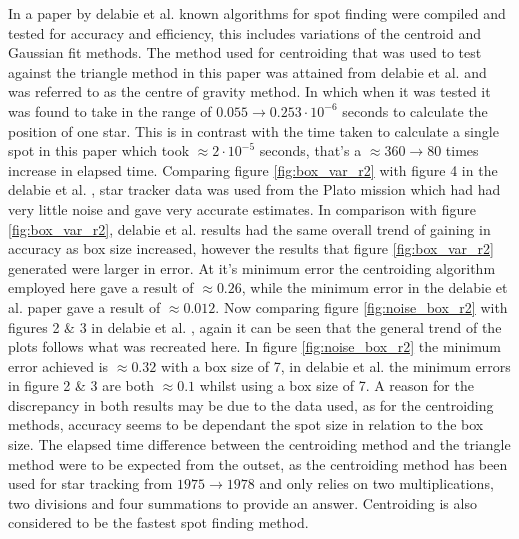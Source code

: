 \documentclass[aps,pra,a4paper,nofootinbib,onecolumn,tightenlines,longbibliography,12pt,amsfonts,amssymb,amsmath,floatfix]{revtex4-2} %
\begin{document}
  In a paper by delabie et al. \cite{delabie2014accurate} known algorithms for spot finding were compiled 
  and tested for accuracy and efficiency, this includes variations of the centroid and Gaussian fit methods.
  The method used for centroiding that was used to test against the triangle method in this paper was attained 
  from delabie et al. \cite{delabie2014accurate} and was referred to as the centre of gravity method. In which when 
  it was tested it was found to take in the range of $0.055\rightarrow 0.253\cdot 10^{-6}$ seconds to calculate 
  the position of one star. This is in contrast with the time taken to calculate a single spot in this paper which 
  took $\approx 2\cdot 10^{-5}$ seconds, that's a $\approx 360\rightarrow 80$ times increase in elapsed 
  time. Comparing figure \ref{fig:box_var_r2} with figure 4 in the delabie et al. \cite{delabie2014accurate},
  star tracker data was used from the Plato mission which had had very little noise and gave very accurate estimates. 
  In comparison with figure \ref{fig:box_var_r2}, delabie et al. results had the same overall trend of gaining in accuracy 
  as box size increased, however the results that figure \ref{fig:box_var_r2} generated were larger in error. At it's 
  minimum error the centroiding algorithm employed here gave a result of $\approx 0.26$, while the minimum error 
  in the delabie et al. paper gave a result of $\approx 0.012$. 
  Now comparing figure \ref{fig:noise_box_r2} with figures 2 \& 3 in delabie et al. \cite{delabie2014accurate}, again 
  it can be seen that the general trend of the plots follows what was recreated here. In figure \ref{fig:noise_box_r2} 
  the minimum error achieved is $\approx 0.32$ with a box size of 7, in delabie et al. the minimum errors in figure 
  2 \& 3 are both $\approx 0.1$ whilst using a box size of 7. A reason for the discrepancy in both results may be due 
  to the data used, as for the centroiding methods, accuracy seems to be dependant the spot size in relation to the 
  box size. The elapsed time difference between the centroiding method and the triangle method were to be expected 
  from the outset, as the centroiding method has been used for star tracking from $1975 \rightarrow 1978$ and only 
  relies on two multiplications, two divisions and four summations to provide an answer. Centroiding is also 
  considered to be the fastest spot finding method.\cite{delabie2014accurate}
\end{document}
